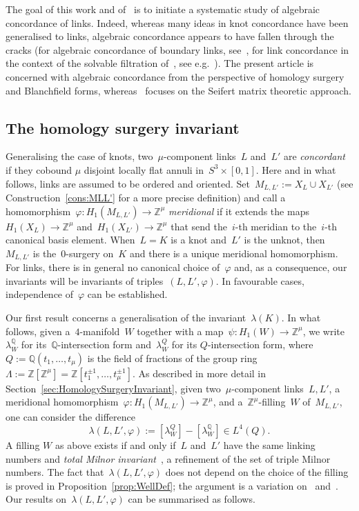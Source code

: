 \documentclass[10.9pt,a4paper]{amsart}
\theoremstyle{definition}
\theoremstyle{remark}
\newcommand{\Z}{\mathbb{Z}}
\newcommand{\Q}{\mathbb{Q}}
\begin{document}
The goal of this work and of~\cite{GaetanPhD,Simian} is to initiate a systematic study of algebraic concordance of links. 
Indeed, whereas many ideas in knot concordance have been generalised to links,  algebraic concordance appears to have fallen through the cracks (for algebraic concordance of boundary links, see~\cite{CappellShanesonLinkCobordism, Ko2,LeDimetThesis, SheihamThesis}, for link concordance in the context of the solvable filtration of~\cite{CochranOrrTeichner}, see e.g.~\cite{HarveyHomology,ChaSymmetric}).
The present article is concerned with algebraic concordance from the perspective of homology surgery and Blanchfield forms, whereas~\cite{Simian} focuses on the Seifert matrix theoretic approach.


\subsection{The homology surgery invariant}

Generalising the case of knots, two~$\mu$-component links~$L$ and~$L'$ are \emph{concordant} if they cobound $\mu$ disjoint locally flat annuli in~$S^3 \times [0,1]$.
Here and in what follows, links are assumed to be ordered and oriented.
Set~$M_{L,L'}:=X_L \cup X_{L'}$ (see Construction~\ref{cons:MLL'} for a more precise definition) and call a homomorphism~$\varphi \colon H_1(M_{L,L'}) \to \Z^\mu$ \emph{meridional} if it extends the maps~$H_1(X_L) \to \Z^\mu$ and~$H_1(X_{L'}) \to \Z^\mu$ that send the~$i$-th meridian to the~$i$-th canonical basis element.
When~$L=K$ is a knot and~$L'$ is the unknot, then~$M_{L,L'}$ is the~$0$-surgery on~$K$ and there is a unique meridional homomorphism.
For links,  there is in general no canonical choice of~$\varphi$ and, as a consequence, our invariants will be invariants of triples~$(L,L',\varphi)$.
In favourable cases,  independence of~$\varphi$ can be established.


Our first result concerns a generalisation of the invariant~$\lambda(K)$.
In what follows, given a~$4$-manifold~$W$ together with a map~$\psi \colon H_1(W) \to \Z^\mu$, 
we write~$\lambda_W^\Q$ for its~$\Q$-intersection form and~$\lambda_W^Q$ for its $Q$-intersection form,
where~$Q:=\Q(t_1,\ldots,t_\mu)$ is the field of fractions of the group ring~$\Lambda:=\Z[\Z^\mu]=\Z[t_1^{\pm 1},\ldots,t_\mu^{\pm 1}]$.
As described in more detail in Section~\ref{sec:HomologySurgeryInvariant}, given two~$\mu$-component links~$L,L'$,  a meridional homomorphism~$\varphi \colon H_1(M_{L,L'}) \to \Z^\mu$,  and a~$\Z^\mu$-filling~$W$ of~$M_{L,L'}$,  one can consider the difference
$$\lambda(L,L',\varphi):=[\lambda_W^Q]-[\lambda_W^\Q] \in L^4(Q).$$ 
A filling $W$ as above exists if and only if~$L$ and~$L'$ have the same linking numbers and {\em total Milnor invariant\/}~\cite{DavisNagelOrsonPowell},  a refinement of the set of triple Milnor numbers.
The fact that~$\lambda(L,L',\varphi)$ does not depend on the choice of the filling is proved in Proposition~\ref{prop:WellDef}; the argument is a variation on~\cite[Section 2]{ChaHirzebruch} and~\cite[Proposition 2.10]{ConwayNagelToffoli}.
Our results on~$\lambda(L,L',\varphi)$ can be summarised as follows.
\end{document}
